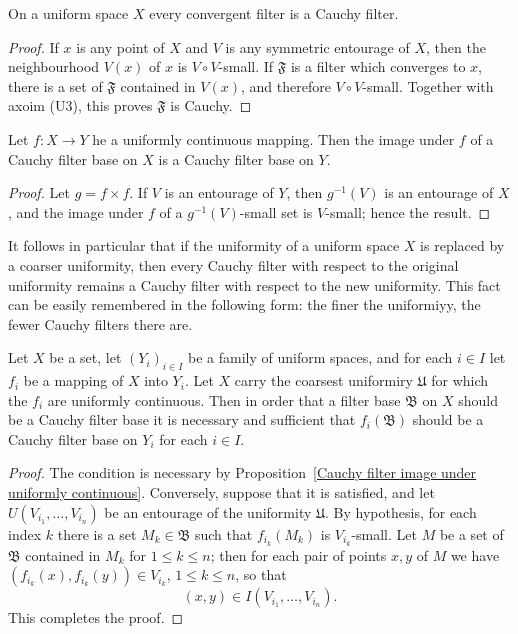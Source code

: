 \begin{proposition}\label{filter convergent is Cauchy}
On a uniform space $X$ every convergent filter is a Cauchy filter.
\end{proposition}
\begin{proof}
If $x$ is any point of $X$ and $V$ is any symmetric entourage of $X$, then the neighbourhood $V(x)$ of $x$ is $V\circ V$-small. If $\mathfrak{F}$ is a filter which converges to $x$, there is a set of $\mathfrak{F}$ contained in $V(x)$, and therefore $V\circ V$-small. Together with axoim (U3), this proves $\mathfrak{F}$ is Cauchy.
\end{proof}
\begin{proposition}\label{Cauchy filter image under uniformly continuous}
Let $f:X\to Y$ he a uniformly continuous mapping. Then the image under $f$ of a Cauchy filter base on $X$ is a Cauchy filter base on $Y$.
\end{proposition}
\begin{proof}
Let $g=f\times f$. If $V$ is an entourage of $Y$, then $g^{-1}(V)$ is an entourage of $X$, and the image under $f$ of a $g^{-1}(V)$-small set is $V$-small; hence the result.
\end{proof}
It follows in particular that if the uniformity of a uniform space $X$ is replaced by a coarser uniformity, then every Cauchy filter with respect to the original uniformity remains a Cauchy filter with respect to the new uniformity. This fact can be easily remembered in the following form: the finer the uniformiyy, the fewer Cauchy filters there are.
\begin{proposition}\label{filter Cauchy on initial topology iff}
Let $X$ be a set, let $(Y_i)_{i\in I}$ be a family of uniform spaces, and for each $i\in I$ let $f_i$ be a mapping of $X$ into $Y_i$. Let $X$ carry the coarsest uniformiry $\mathfrak{U}$ for which the $f_i$ are uniformly continuous. Then in order that a filter base $\mathfrak{B}$ on $X$ should be a Cauchy filter base it is necessary and sufficient that $f_i(\mathfrak{B})$ should be a Cauchy filter base on $Y_i$ for each $i\in I$.
\end{proposition}
\begin{proof}
The condition is necessary by Proposition~\ref{Cauchy filter image under uniformly continuous}. Conversely, suppose that it is satisfied, and let $U(V_{i_1},\dots,V_{i_n})$ be an entourage of the uniformity $\mathfrak{U}$. By hypothesis, for each index $k$ there is a set $M_k\in\mathfrak{B}$ such that $f_{i_k}(M_k)$ is $V_{i_k}$-small. Let $M$ be a set of $\mathfrak{B}$ contained in $M_k$ for $1\leq k\leq n$; then for each pair of points $x,y$ of $M$ we have $(f_{i_k}(x),f_{i_k}(y))\in V_{i_k}$, $1\leq k\leq n$, so that
\[(x,y)\in I(V_{i_1},\dots,V_{i_n}).\]
This completes the proof.
\end{proof}

